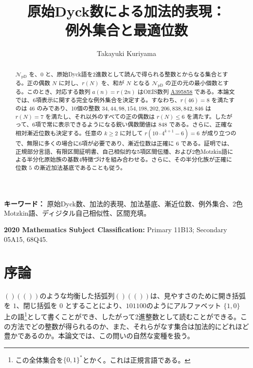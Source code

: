 \documentclass[12pt]{ltjsarticle}
\title{原始Dyck数による加法的表現：\\例外集合と最適位数}
\author{Takayuki Kuriyama}
\date{}
\theoremstyle{plain}
\theoremstyle{definition}
\theoremstyle{plain}
\newcommand{\NpD}{\mathcal{N}_{\mathrm{pD}}}
\newcommand{\seqnum}[1]{\href{https://oeis.org/#1}{\textrm{\underline{#1}}}}
\begin{document}
\maketitle

\begin{abstract}
$\NpD$ を、$0$ と、原始Dyck語を2進数として読んで得られる整数とからなる集合とする。正の偶数 $N$ に対し、$r(N)$ を、和が $N$ となる $\NpD$ の正の元の最小個数とする。このとき、対応する数列 $a(n)=r(2n)$ はOEIS数列 \seqnum{A395858} である。本論文では、6項表示に関する完全な例外集合を決定する。すなわち、$r(46)=8$ を満たすのは $46$ のみであり、10個の整数
$34,44,98,154,198,202,206,838,842,846$ は $r(N)=7$ を満たし、それ以外のすべての正の偶数は $r(N)\leq6$ を満たす。したがって、6項で常に表示できるようになる鋭い偶数閾値は $848$ である。さらに、正確な相対漸近位数も決定する。任意の $k\geq2$ に対して
$r(10\cdot4^{k+1}-6)=6$ が成り立つので、無限に多くの場合に6項が必要であり、漸近位数は正確に $6$ である。証明では、正規部分言語、有限区間証明書、自己相似的な5項区間伝播、および2色Motzkin語による半分化原始族の基数4特徴づけを組み合わせる。さらに、その半分化族が正確に位数 $5$ の漸近加法基底であることも従う。
\end{abstract}

\noindent\textbf{キーワード：} 原始Dyck数、加法的表現、加法基底、漸近位数、例外集合、2色Motzkin語、ディジタル自己相似性、区間充填。

\noindent\textbf{2020 Mathematics Subject Classification:} Primary 11B13;
Secondary 05A15, 68Q45.

\section{序論}\label{sec:introduction}

$()(())$のような均衡した括弧列$()(())$は、見やすさのために開き括弧を $1$、閉じ括弧を $0$ とすることにより、$101100$のようにアルファベット $\{1,0\}$ 上の語\footnote{この全体集合を$\{0,1\}^*$とかく。これは正規言語である。}として書くことができ、したがって2進整数として読むことができる。この方法でどの整数が得られるのか、また、それらがなす集合は加法的にどれほど豊かであるのか。本論文では、この問いの自然な変種を扱う。
\end{document}
